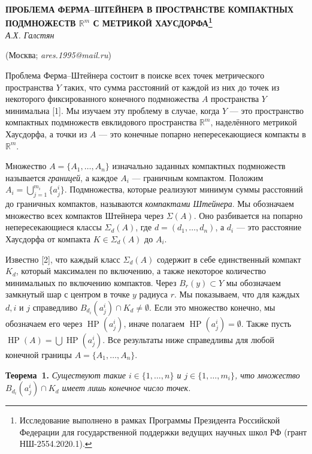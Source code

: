 \begin{center}
    {\bf ПРОБЛЕМА ФЕРМА--ШТЕЙНЕРА В ПРОСТРАНСТВЕ КОМПАКТНЫХ ПОДМНОЖЕСТВ $\mathbb{R}^m$ С МЕТРИКОЙ ХАУСДОРФА\footnote{Исследование выполнено в рамках Программы Президента Российской Федерации для государственной поддержки ведущих научных школ РФ (грант НШ-2554.2020.1).}}\\

    {\it А.Х. Галстян}

    (Москва; {\it ares.1995@mail.ru})
\end{center}


Проблема Ферма--Штейнера состоит в поиске всех точек метрического пространства $Y$ таких, что сумма расстояний от каждой из них до точек из некоторого фиксированного конечного подмножества $A$ пространства $Y$ минимальна [1]. Мы изучаем эту проблему в случае, когда $Y$ --- это пространство компактных подмножеств евклидового пространства $\mathbb{R}^m$, наделённого метрикой Хаусдорфа, а точки из $A$ --- это конечные попарно непересекающиеся компакты в $\mathbb{R}^m$.

Множество $A = \{A_1, \ldots, A_n\}$ изначально заданных компактных подмножеств называется \emph{границей}, а каждое $A_i$ — граничным компактом. Положим $A_i = \bigcup_{j=1}^{m_i} \{a^i_j\}$. Подмножества, которые реализуют минимум суммы расстояний до граничных компактов, называются \emph{компактами Штейнера}. Мы обозначаем множество всех компактов Штейнера через $\Sigma(A)$. Оно разбивается на попарно непересекающиеся классы $\Sigma_d(A)$, где $d = (d_1, \ldots, d_n)$, а $d_i$ --- это расстояние Хаусдорфа от компакта $K\in \Sigma_d(A)$ до $A_i$.

Известно [2], что каждый класс $\Sigma_d(A)$ содержит в себе единственный компакт $K_d$, который максимален по включению, а также некоторое количество минимальных по включению компактов. Через $B_r(y) \subset Y$ мы обозначаем замкнутый шар с центром в точке $y$ радиуса $r$. Мы показываем, что для каждых $d, i$ и $j$ справедливо $B_{d_i} (a^i_j) \cap K_d \neq \emptyset$. Если это множество конечно, мы обозначаем его через $\operatorname{HP}(a^i_j)$, иначе полагаем $\operatorname{HP}(a^i_j)=\emptyset$. Также пусть $\operatorname{HP}(A)=\bigcup \operatorname{HP}(a^i_j)$. Все результаты ниже справедливы для любой конечной границы $A = \{A_1,\ldots,A_n\}$.

\textbf{Теорема~1.} {\it Существуют такие $i \in \{1,\ldots,n\}$ и $j \in \{1,\ldots,m_i\}$, что множество $B_{d_i} (a^i_j) \cap K_d$ имеет лишь конечное число точек.}

